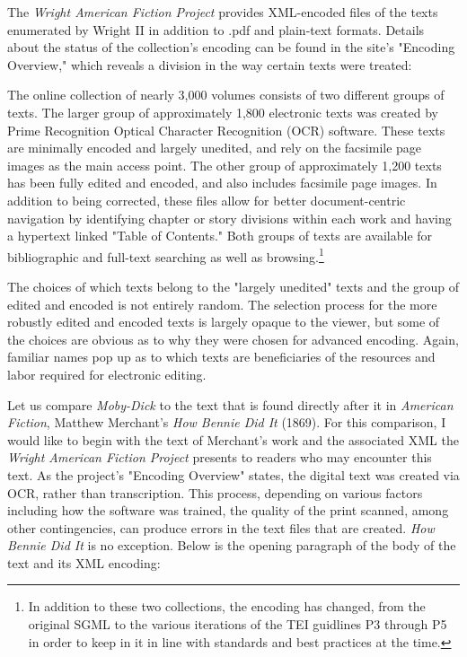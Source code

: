 The \textit{Wright American Fiction Project} provides XML-encoded files of the texts enumerated by Wright II in addition to .pdf and plain-text formats. Details about the status of the collection's encoding can be found in the site's "Encoding Overview," which reveals a division in the way certain texts were treated:
\begin{displayquote}
The online collection of nearly 3,000 volumes consists of two different groups of texts. The larger group of approximately 1,800 electronic texts was created by Prime Recognition Optical Character Recognition (OCR) software. These texts are minimally encoded and largely unedited, and rely on the facsimile page images as the main access point. The other group of approximately 1,200 texts has been fully edited and encoded, and also includes facsimile page images. In addition to being corrected, these files allow for better document-centric navigation by identifying chapter or story divisions within each work and having a hypertext linked "Table of Contents." Both groups of texts are available for bibliographic and full-text searching as well as browsing.\autocite{noauthor_encoding_nodate}\footnote{In addition to these two collections, the encoding has changed, from the original SGML to the various iterations of the TEI guidlines P3 through P5 in order to keep in it in line with standards and best practices at the time.}
\end{displayquote}
The choices of which texts belong to the "largely unedited" texts and the group of edited and encoded is not entirely random. The selection process for the more robustly edited and encoded texts is largely opaque to the viewer, but some of the choices are obvious as to why they were chosen for advanced encoding. Again, familiar names pop up as to which texts are beneficiaries of the resources and labor required for electronic editing. 

Let us compare \textit{Moby-Dick} to the text that is found directly after it in \textit{American Fiction}, Matthew Merchant's \textit{How Bennie Did It} (1869). For this comparison, I would like to begin with the text of Merchant's work and the associated XML the \textit{Wright American Fiction Project} presents to readers who may encounter this text. As the project's "Encoding Overview" states, the digital text was created via OCR, rather than transcription. This process, depending on various factors including how the software was trained, the quality of the print scanned, among other contingencies, can produce errors in the text files that are created. \textit{How Bennie Did It} is no exception. Below is the opening paragraph of the body of the text and its XML encoding:

